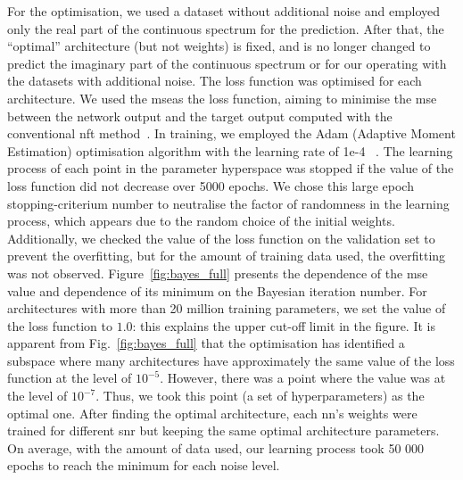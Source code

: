 For the optimisation, we used a dataset without additional noise and employed only the real part of the continuous spectrum for the prediction. After that, the ``optimal'' architecture (but not weights) is fixed, and is no longer changed to predict the imaginary part of the continuous spectrum or for our operating with the datasets with additional noise.
The loss function was optimised for each architecture. We used the \acrshort{mse}as the loss function, aiming to minimise the \acrshort{mse} between the network output and the target output computed with the conventional \acrshort{nft} method~\cite{FNFT2018}. In training, we employed the Adam (Adaptive Moment Estimation) optimisation algorithm with the learning rate of 1e-4 ~\cite{s2000adaptive}. 
The learning process of each point in the parameter hyperspace was stopped if the value of the loss function did not decrease over 5000 epochs. 
We chose this large epoch stopping-criterium number to neutralise the factor of randomness in the learning process, which appears due to the random choice of the initial weights. Additionally, we checked the value of the loss function on the validation set to prevent the overfitting, but for the amount of training data used, the overfitting was not observed. 
Figure~\ref{fig:bayes_full} presents the dependence of the \acrshort{mse} value and dependence of its minimum on the  Bayesian iteration number. For architectures with more than 20 million training parameters, we set the value of the loss function to $1.0$: this explains the upper cut-off limit in the figure. It is apparent from Fig.~\ref{fig:bayes_full} that the optimisation has identified a subspace where many architectures have approximately the same value of the loss function at the level of $10^{-5}$. However, there was a point where the value was at the level of $10^{-7}$. Thus, we took this point (a set of hyperparameters) as the optimal one.
After finding the optimal architecture, each \acrshort{nn}'s weights were trained for different \acrshort{snr} but keeping the same optimal architecture parameters. On average, with the amount of data used, our learning process took 50 000 epochs to reach the minimum for each noise level.


